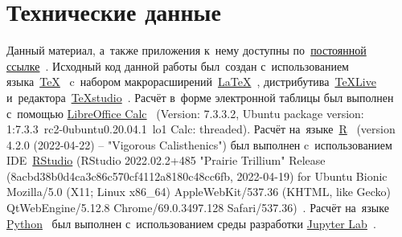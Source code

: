 \documentclass[]{scrartcl}
\begin{document}
\section{Технические данные}
Данный материал, а~также приложения к~нему доступны по~\href{https://github.com/Kirill-Murashev/AI_for_valuers_book/tree/main/Parts-Chapters/Mann-Whitney-Wilcoxon}{постоянной ссылке}~\cite{Murashev:u-test}. Исходный код данной работы был~создан с~использованием языка~\href{https://www.ctan.org/}{\TeX}~\cite{TeX:site} c~набором макрорасширений~\href{https://www.latex-project.org/}{\LaTeX}~\cite{LaTeX:site}, дистрибутива~\href{https://www.tug.org/texlive/}{TeXLive}~\cite{TeXLive:site} и~редактора~\href{https://www.texstudio.org/}{TeXstudio}~\cite{TeXstudio:site}. Расчёт в~форме электронной таблицы был выполнен с~помощью \href{https://www.libreoffice.org/discover/calc/}{LibreOffice Calc}~\cite{LO:Calc} (Version: 7.3.3.2, Ubuntu package version: 1:7.3.3~rc2-0ubuntu0.20.04.1~lo1 Calc: threaded). Расчёт на~языке~\href{https://www.r-project.org/}{R}~\cite{R_language} (version 4.2.0 (2022-04-22) -- "Vigorous Calisthenics") был выполнен c~использованием IDE~\href{URL}{RStudio} (RStudio 2022.02.2+485 "Prairie Trillium" Release (8acbd38b0d4ca3c86c570cf4112a8180c48cc6fb, 2022-04-19) for Ubuntu Bionic Mozilla/5.0 (X11; Linux x86\_64) AppleWebKit/537.36 (KHTML, like Gecko) QtWebEngine/5.12.8 Chrome/69.0.3497.128 Safari/537.36)~\cite{RStudio:official_site}. Расчёт на~языке \href{https://www.python.org/}{Python}~\cite{Python:site} был выполнен с~использованием среды разработки \href{https://jupyter.org}{Jupyter Lab}~\cite{Jupyter:site}.
%
\end{document}
